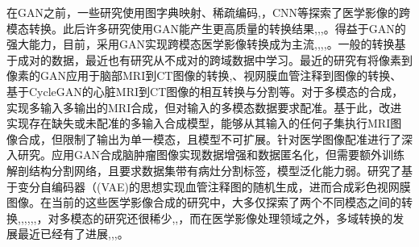 \documentclass[letterpaper]{article} %
\begin{document}
在GAN之前，一些研究使用图字典映射\cite{22burgos2015robust}、稀疏编码\cite{33huang2017simultaneous},\cite{34vemulapalli2015unsupervised}，CNN\cite{36vannguyen2015crossdomain}等探索了医学影像的跨模态转换。此后许多研究使用GAN能产生更高质量的转换结果\cite{1zhao2018modular},\cite{5liang2018generative},\cite{6zhu2017unpaired},\cite{13choi2018stargan:}。得益于GAN的强大能力，目前，采用GAN实现跨模态医学影像转换成为主流\cite{2zhang2018translating},\cite{20nie2017medical},\cite{35osokin2017gans},\cite{36vannguyen2015crossdomain},\cite{40kamnitsas2017unsupervised}。一般的转换基于成对的数据，最近也有研究从不成对的跨域数据中学习\cite{2zhang2018translating}。最近的研究有将像素到像素的GAN应用于脑部MRI到CT图像的转换\cite{20nie2017medical},\cite{40kamnitsas2017unsupervised}、视网膜血管注释到图像的转换\cite{41costa2017towards}、基于CycleGAN\cite{6zhu2017unpaired}的心脏MRI到CT图像的相互转换与分割\cite{20nie2017medical}等。对于多模态的合成，\cite{84chartsias2018multimodal}实现多输入多输出的MRI合成，但对输入的多模态数据要求配准。基于此，\cite{85joyce2017robust}改进实现存在缺失或未配准的多输入合成模型，能够从其输入的任何子集执行MRI图像合成，但限制了输出为单一模态，且模型不可扩展。\cite{66miao2018dilated}针对医学图像配准进行了深入研究。\cite{4shin2018medical}应用GAN合成脑肿瘤图像实现数据增强和数据匿名化，但需要额外训练解剖结构分割网络，且要求数据集带有病灶分割标签，模型泛化能力弱。\cite{41costa2017towards}研究了基于变分自编码器（(VAE)\cite{87kingma2014auto-encoding,88rezende2014stochastic}的思想实现血管注释图的随机生成，进而合成彩色视网膜图像。在当前的这些医学影像合成的研究中，大多仅探索了两个不同模态之间的转换\cite{2zhang2018translating},\cite{20nie2017medical},\cite{22burgos2015robust},\cite{34vemulapalli2015unsupervised},\cite{35osokin2017gans},\cite{36vannguyen2015crossdomain},\cite{40kamnitsas2017unsupervised}，对多模态的研究还很稀少\cite{84chartsias2018multimodal},\cite{85joyce2017robust},\cite{4shin2018medical}，而在医学影像处理领域之外，多域转换的发展最近已经有了进展\cite{1zhao2018modular},\cite{5liang2018generative},\cite{13choi2018stargan:},\cite{27isola2017image-to-image}。
\end{document}
